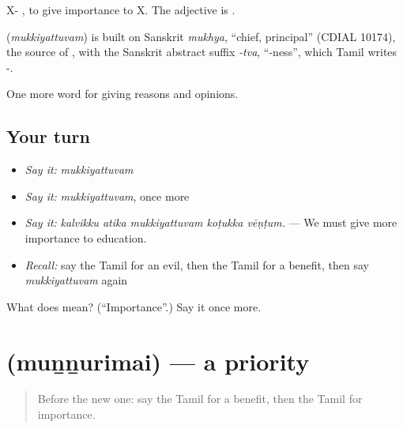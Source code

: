 X-  , to give importance to X. The adjective is .

\begin{cousinweb}
\textbf{} (\emph{mukkiyattuvam}) is built on Sanskrit \emph{mukhya}, \textquotedblleft{}chief, principal\textquotedblright{} (CDIAL 10174), the source of , with the Sanskrit abstract suffix \emph{-tva}, \textquotedblleft{}-ness\textquotedblright{}, which Tamil writes -.
\end{cousinweb}

\begin{grammarlens}[title={What you've built}]
One more word for giving reasons and opinions.
\end{grammarlens}

\subsection*{Your turn}
\begin{itemize}
\raggedright
  \item \emph{Say it:} \emph{mukkiyattuvam}
  \item \emph{Say it:} \emph{mukkiyattuvam}, once more
  \item \emph{Say it:} \emph{kalvikku atika mukkiyattuvam koṭukka vēṇṭum.} — We must give more importance to education.
  \item \emph{Recall:} say the Tamil for an evil, then the Tamil for a benefit, then say \emph{mukkiyattuvam} again
\end{itemize}

\begin{tcolorbox}[breakable,colback=teal!4,colframe=teal!35!black,title={Before you move on}]
What does  mean? (\textquotedblleft{}Importance\textquotedblright{}.) Say it once more.
\end{tcolorbox}
\section[\texorpdfstring{\ta{முன்னுரிமை} (muṉṉurimai)}{முன்னுரிமை (muṉṉurimai)}]{ (muṉṉurimai) — a priority}

\label{lesson:TA-C354-munnurimai}



\begin{quote}
Before the new one: say the Tamil for a benefit, then the Tamil for importance.
\end{quote}

